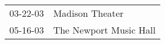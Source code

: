 \begin{supertabular}{p{0.25\columnwidth}p{0.75\columnwidth}}
 03-22-03 &         Madison Theater \\
 05-16-03 &  The Newport Music Hall \\
\end{supertabular}
